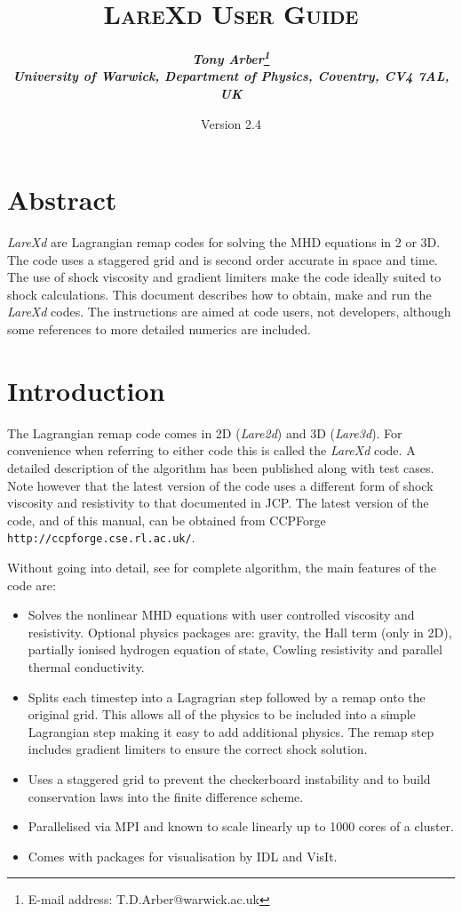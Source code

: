 \documentclass[11pt]{article}
\begin{document}
\title{
\bfseries\scshape LareXd User Guide}
\author{\bfseries\itshape Tony Arber\thanks{E-mail address: T.D.Arber@warwick.ac.uk}\\
University of Warwick, Department of Physics, Coventry, CV4 7AL, UK}
\date{Version 2.4}
\maketitle

\thispagestyle{empty}

\section*{Abstract}
{\it LareXd} are Lagrangian remap codes for solving the MHD equations in 2 or 3D. The code uses a staggered grid and is second order accurate in space and time. The use of shock viscosity and gradient limiters make the code ideally suited to shock calculations. This document describes how to obtain, make and run the {\it LareXd}  codes. The instructions are aimed at code users, not developers, although some references to more detailed numerics are included.


\section{Introduction}
The Lagrangian remap code comes in 2D ({\it Lare2d}) and 3D ({\it Lare3d}). For convenience when referring to either code this is called the {\it LareXd} code. A detailed description of the algorithm has been published \cite{jcp} along with test cases. Note however that the latest version of the code uses a different form of shock viscosity and resistivity to that documented in JCP. The latest version of the code, and of this manual, can be obtained from CCPForge {\tt http://ccpforge.cse.rl.ac.uk/}. 

Without going into detail, see \cite{jcp} for complete algorithm, the main features of the code are:
\begin{itemize}
 \item Solves the nonlinear MHD equations with user controlled viscosity and resistivity. Optional physics packages are: gravity, the Hall term (only in 2D), partially ionised hydrogen equation of state, Cowling resistivity and parallel thermal conductivity.
 \item Splits each timestep into a Lagragrian step followed by a remap onto the original grid. This allows all of the physics to be included into a simple Lagrangian step making it easy to add additional physics. The remap step includes gradient limiters to ensure the correct shock solution.
 \item Uses a staggered grid to prevent the checkerboard instability and to build conservation laws into the finite difference scheme.
 \item Parallelised via MPI and known to scale linearly up to 1000 cores of a cluster.
 \item Comes with packages for visualisation by IDL and VisIt. \cite{visit}
\end{itemize}
\end{document}
